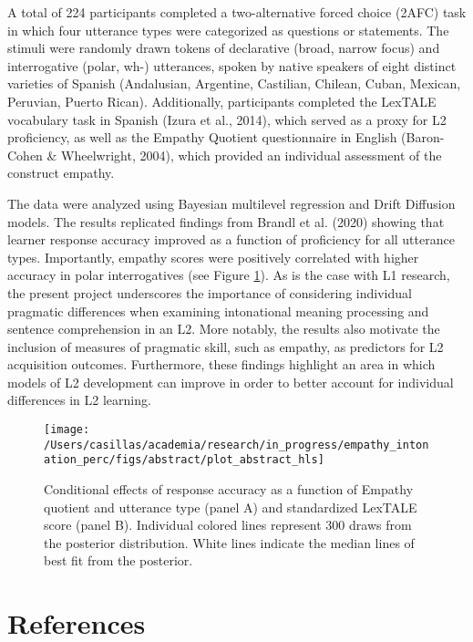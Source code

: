 \documentclass[
  12pt,
]{article}
\begin{document}
A total of 224 participants completed a two-alternative forced choice
(2AFC) task in which four utterance types were categorized as questions
or statements. The stimuli were randomly drawn tokens of declarative
(broad, narrow focus) and interrogative (polar, wh-) utterances, spoken
by native speakers of eight distinct varieties of Spanish (Andalusian,
Argentine, Castilian, Chilean, Cuban, Mexican, Peruvian, Puerto Rican).
Additionally, participants completed the LexTALE vocabulary task in
Spanish (Izura et al., 2014), which served as a proxy for L2
proficiency, as well as the Empathy Quotient questionnaire in English
(Baron-Cohen \& Wheelwright, 2004), which provided an individual
assessment of the construct empathy.

The data were analyzed using Bayesian multilevel regression and Drift
Diffusion models. The results replicated findings from Brandl et al.
(2020) showing that learner response accuracy improved as a function of
proficiency for all utterance types. Importantly, empathy scores were
positively correlated with higher accuracy in polar interrogatives (see
Figure \ref{fig:plot-2panel-emp-prof}). As is the case with L1 research,
the present project underscores the importance of considering individual
pragmatic differences when examining intonational meaning processing and
sentence comprehension in an L2. More notably, the results also motivate
the inclusion of measures of pragmatic skill, such as empathy, as
predictors for L2 acquisition outcomes. Furthermore, these findings
highlight an area in which models of L2 development can improve in order
to better account for individual differences in L2 learning.

\clearpage

\begin{figure}
\texttt{[image: /Users/casillas/academia/research/in\_progress/empathy\_intonation\_perc/figs/abstract/plot\_abstract\_hls]} \caption{Conditional effects of response accuracy as a function of Empathy 
quotient and utterance type (panel A) and standardized LexTALE score (panel B). 
Individual colored lines represent 300 draws from the posterior distribution. White lines indicate the median lines of best fit from the posterior.}\label{fig:plot-2panel-emp-prof}
\end{figure}

\hypertarget{references}{%
\section{References}\label{references}}
\end{document}

